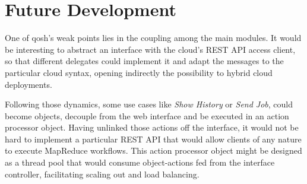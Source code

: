 \section*{Future Development}\label{sec:directricesfuturo}
\noindent One of qosh's weak points lies in the coupling among the main modules. It would be interesting to abstract an interface with the cloud's REST API access client, so that different delegates could implement it and adapt the messages to the particular cloud syntax, opening indirectly the possibility to hybrid cloud deployments.

Following those dynamics, some use cases like \emph{Show History} or \emph{Send Job}, could become objects, decouple from the web interface and be executed in an action processor object. Having unlinked those actions off the interface, it would not be hard to implement a particular REST API that would allow clients of any nature to execute MapReduce workflows. This action processor object might be designed as a thread pool that would consume object-actions fed from the interface controller, facilitating scaling out and load balancing.
